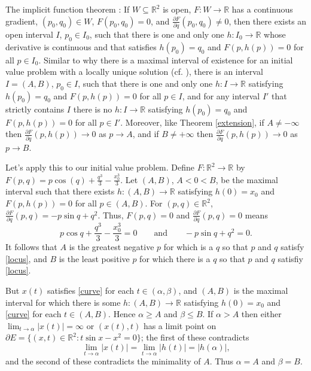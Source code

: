 \documentclass{article}
\theoremstyle{definition}
\begin{document}
The implicit function theorem \cite[p.~36, Theorem 3.2.1]{MR1894435}: If $W \subseteq \mathbb{R}^2$ is open, $F:W \to \mathbb{R}$ has a continuous gradient, $(p_0,q_0) \in W$,
$F(p_0,q_0)=0$, and $\frac{\partial F}{\partial q}(p_0,q_0) \neq 0$, then there exists an open interval $I$, $p_0 \in I_0$, such that there is one and only
one $h:I_0 \to \mathbb{R}$ whose derivative is continuous and that satisfies $h(p_0)=q_0$ and $F(p,h(p))=0$ for all $p \in I_0$.
Similar to why there is a maximal interval of existence for an initial value problem with a locally unique solution (cf. \cite[p.~51, Theorem 2.13]{teschl}), there is an
interval $I=(A,B)$, $p_0 \in I$, such that there is one and only one $h:I \to \mathbb{R}$ satisfying $h(p_0)=q_0$ and $F(p,h(p))=0$ for all $p \in I$, and for any interval
$I'$ that strictly contains $I$ there is no $h:I \to \mathbb{R}$ satisfying $h(p_0)=q_0$ and $F(p,h(p))=0$ for all $p \in I'$. Moreover, like Theorem
\ref{extension}, if $A \neq -\infty$ then
$\frac{\partial F}{\partial q}(p,h(p)) \to 0$ as $p \to A$, and if $B \neq +\infty$ then $\frac{\partial F}{\partial q}(p,h(p)) \to 0$ as $p \to B$.

Let's apply this to our initial value problem. Define $F:\mathbb{R}^2 \to \mathbb{R}$ by $F(p,q)=p\cos(q)+\frac{q^3}{3}-\frac{x_0^3}{3}$.
Let $(A,B)$, $A<0<B$, be the maximal interval such that there exists $h:(A,B) \to \mathbb{R}$ satisfying $h(0)=x_0$ and $F(p,h(p))=0$ for
all $p \in (A,B)$. 
For $(p,q) \in \mathbb{R}^2$,
$\frac{\partial F}{\partial q}(p,q)=-p\sin q+q^2$. Thus, $F(p,q)=0$ and $\frac{\partial F}{\partial q}(p,q)=0$ means
\begin{equation}
p\cos q+\frac{q^3}{3}-\frac{x_0^3}{3}=0 \qquad \textrm{and}  \qquad -p\sin q+q^2=0.
\label{locus}
\end{equation}
It follows that $A$ is the greatest negative $p$ for which is a $q$ so that $p$ and $q$ satisfy \eqref{locus},
and  $B$ is the least positive $p$ for which there is a $q$ so that $p$ and $q$ satisfiy \eqref{locus}.

But $x(t)$ satisfies \eqref{curve} for each $t \in (\alpha,\beta)$, and $(A,B)$ is the maximal interval for which there is some $h:(A,B) \to \mathbb{R}$ satisfying $h(0)=x_0$ and
\eqref{curve} for each $t \in (A,B)$. Hence $\alpha \geq A$ and $\beta \leq B$.  If $\alpha>A$ then either $\lim_{t \to \alpha}|x(t)|=\infty$ or $(x(t),t)$ has a limit point on 
$\partial E=\{(x,t) \in \mathbb{R}^2: t\sin x-x^2 = 0\}$; the first of these contradicts
\[
\lim_{t \to \alpha}|x(t)|=\lim_{t \to \alpha} |h(t)|=|h(\alpha)|,
\]
and the second of these contradicts the minimality of $A$. Thus $\alpha=A$ and $\beta=B$.
\end{document}
